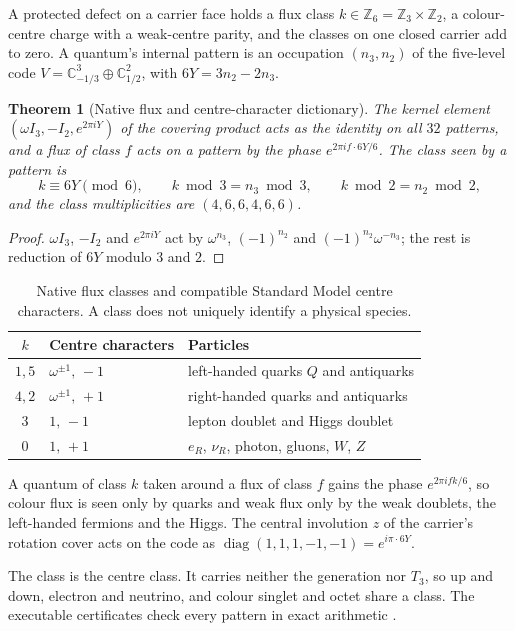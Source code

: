 \documentclass[11pt]{article}
\newtheorem{theorem}{Theorem}[section]
\theoremstyle{definition}
\theoremstyle{remark}
\begin{document}
A protected defect on a carrier face holds a flux class
$k\in\mathbb Z_6=\mathbb Z_3\times\mathbb Z_2$,
a colour-centre charge with a weak-centre parity, and the classes on one closed carrier add to zero. A
quantum's internal pattern is an occupation $(n_3,n_2)$ of the five-level code
$V=\mathbb C^3_{-1/3}\oplus\mathbb C^2_{1/2}$, with $6Y=3n_2-2n_3$.

\begin{theorem}[Native flux and centre-character dictionary]
\label{thm:defect-classes}
The kernel element $(\omega I_3,-I_2,e^{2\pi iY})$ of the covering product acts as the
identity on all $32$ patterns, and a flux of class $f$ acts on a pattern by the phase
$e^{2\pi if\cdot6Y/6}$. The class seen by a pattern is
\[
 k\equiv 6Y \pmod 6,\qquad k\bmod 3=n_3\bmod 3,\qquad k\bmod 2=n_2\bmod 2,
\]
and the class multiplicities are $(4,6,6,4,6,6)$.
\end{theorem}
\begin{proof}
$\omega I_3$, $-I_2$ and $e^{2\pi iY}$ act by $\omega^{n_3}$, $(-1)^{n_2}$ and
$(-1)^{n_2}\omega^{-n_3}$; the rest is reduction of $6Y$ modulo $3$ and $2$.
\end{proof}

\begin{table}[htbp]
\centering\small
\caption{Native flux classes and compatible Standard Model centre characters. A class does not uniquely identify a physical species.}
\label{tab:defect-families}
\begin{tabular}{@{}cll@{}}
\toprule
$k$ & Centre characters & Particles\\
\midrule
$1,5$ & $\omega^{\pm1},\,-1$ & left-handed quarks $Q$ and antiquarks\\
$4,2$ & $\omega^{\pm1},\,+1$ & right-handed quarks and antiquarks\\
$3$ & $1,\,-1$ & lepton doublet and Higgs doublet\\
$0$ & $1,\,+1$ & $e_R$, $\nu_R$, photon, gluons, $W$, $Z$\\
\bottomrule
\end{tabular}
\end{table}

A quantum of class $k$ taken around a flux of class $f$ gains the phase $e^{2\pi ifk/6}$,
so colour flux is seen only by quarks and weak flux only by the weak doublets, the
left-handed fermions and the Higgs. The
central involution $z$ of the carrier's rotation cover acts on the code as
$\operatorname{diag}(1,1,1,-1,-1)=e^{i\pi\cdot6Y}$.

The class is the centre class. It carries neither the generation nor $T_3$, so up and down,
electron and neutrino, and colour singlet and octet share a class. The executable certificates check every
pattern in exact arithmetic \cite{ophparticles,ophrepo}.
\end{document}
